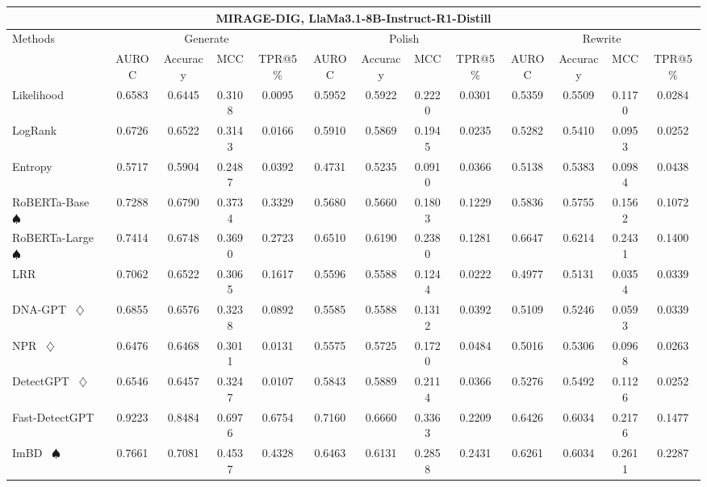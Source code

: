 \begin{table*}[h]
{\begin{tabular}{l|cccc|cccc|cccc}
    \hline

    \hline
    \multicolumn{13}{c}{\textbf{MIRAGE-DIG, LlaMa3.1-8B-Instruct-R1-Distill}}\\
    \hline

    \hline

    \hline
    \multirow{2}{*}{Methods}&\multicolumn{4}{c|}{Generate}&\multicolumn{4}{c|}{Polish}&\multicolumn{4}{c}{Rewrite} \\
    &  AUROC  &  Accuracy  &  MCC  &  TPR@5\%  &  AUROC  &  Accuracy  &  MCC  &  TPR@5\%  &  AUROC  &  Accuracy  &  MCC  &  TPR@5\%  \\
    \hline

    \hline
    Likelihood~\cite{likelihood} & 0.6583 & 0.6445 & 0.3108 & 0.0095 & 0.5952 & 0.5922 & 0.2220 & 0.0301 & 0.5359 & 0.5509 & 0.1170 & 0.0284 \\
    LogRank~\cite{logrank} & 0.6726 & 0.6522 & 0.3143 & 0.0166 & 0.5910 & 0.5869 & 0.1945 & 0.0235 & 0.5282 & 0.5410 & 0.0953 & 0.0252 \\
    Entropy~\cite{entropy} & 0.5717 & 0.5904 & 0.2487 & 0.0392 & 0.4731 & 0.5235 & 0.0910 & 0.0366 & 0.5138 & 0.5383 & 0.0984 & 0.0438 \\
    RoBERTa-Base~\cite{roberta} $\spadesuit$ & 0.7288 & 0.6790 & 0.3734 & 0.3329 & 0.5680 & 0.5660 & 0.1803 & 0.1229 & 0.5836 & 0.5755 & 0.1562 & 0.1072 \\
    RoBERTa-Large~\cite{roberta} $\spadesuit$ & 0.7414 & 0.6748 & 0.3690 & 0.2723 & 0.6510 & 0.6190 & 0.2380 & 0.1281 & 0.6647 & 0.6214 & 0.2431 & 0.1400 \\
    LRR~\cite{lrrandnpr} & 0.7062 & 0.6522 & 0.3065 & 0.1617 & 0.5596 & 0.5588 & 0.1244 & 0.0222 & 0.4977 & 0.5131 & 0.0354 & 0.0339 \\
    DNA-GPT~\cite{dna-gpt} $\diamondsuit$ & 0.6855 & 0.6576 & 0.3238 & 0.0892 & 0.5585 & 0.5588 & 0.1312 & 0.0392 & 0.5109 & 0.5246 & 0.0593 & 0.0339 \\
    NPR~\cite{lrrandnpr} $\diamondsuit$ & 0.6476 & 0.6468 & 0.3011 & 0.0131 & 0.5575 & 0.5725 & 0.1720 & 0.0484 & 0.5016 & 0.5306 & 0.0968 & 0.0263 \\
    DetectGPT~\cite{detectgpt} $\diamondsuit$ & 0.6546 & 0.6457 & 0.3247 & 0.0107 & 0.5843 & 0.5889 & 0.2114 & 0.0366 & 0.5276 & 0.5492 & 0.1126 & 0.0252 \\
    Fast-DetectGPT~\cite{fastdetectgpt} & 0.9223 & 0.8484 & 0.6976 & 0.6754 & 0.7160 & 0.6660 & 0.3363 & 0.2209 & 0.6426 & 0.6034 & 0.2176 & 0.1477 \\
    ImBD~\cite{imbd} $\spadesuit$ & 0.7661 & 0.7081 & 0.4537 & 0.4328 & 0.6463 & 0.6131 & 0.2858 & 0.2431 & 0.6261 & 0.6034 & 0.2611 & 0.2287 \\
    \hline
    

\end{tabular}}
\end{table*}

